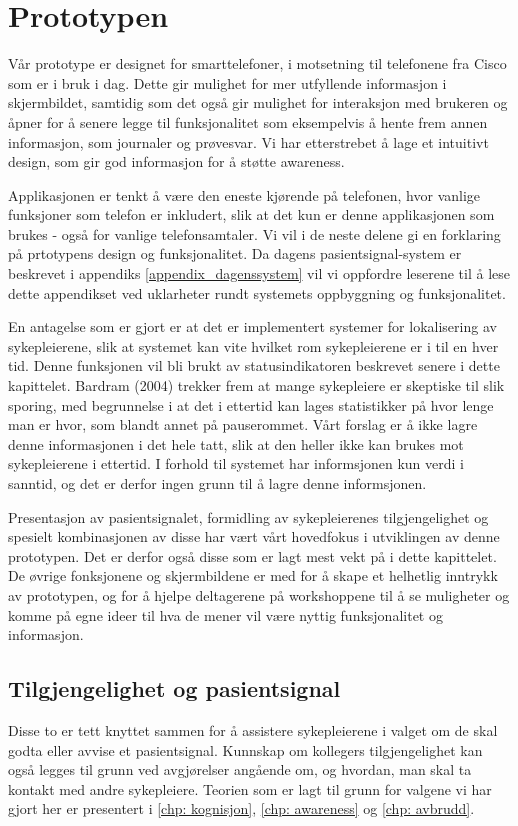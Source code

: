 \section{Prototypen}
\label{prototypen}

Vår prototype er designet for smarttelefoner, i motsetning til telefonene fra Cisco som er i bruk i dag. Dette gir mulighet for mer utfyllende informasjon i skjermbildet, samtidig som det også gir mulighet for interaksjon med brukeren og åpner for å senere legge til funksjonalitet som eksempelvis å hente frem annen informasjon, som journaler og prøvesvar. Vi har etterstrebet å lage et intuitivt design, som gir god informasjon for å støtte awareness.

\noindent
Applikasjonen er tenkt å være den eneste kjørende på telefonen, hvor vanlige funksjoner som telefon er inkludert, slik at det kun er denne applikasjonen som brukes - også for vanlige telefonsamtaler. Vi vil i de neste delene gi en forklaring på prtotypens design og funksjonalitet. Da dagens pasientsignal-system er beskrevet i appendiks \ref{appendix_dagenssystem} vil vi oppfordre leserene til å lese dette appendikset ved uklarheter rundt systemets oppbyggning og funksjonalitet.

\noindent
En antagelse som er gjort er at det er implementert systemer for lokalisering av sykepleierene, slik at systemet kan vite hvilket rom sykepleierene er i til en hver tid. Denne funksjonen vil bli brukt av statusindikatoren beskrevet senere i dette kapittelet. Bardram (2004) trekker frem at mange sykepleiere er skeptiske til slik sporing, med begrunnelse i at det i ettertid kan lages statistikker på hvor lenge man er hvor, som blandt annet på pauserommet. Vårt forslag er å ikke lagre denne informasjonen i det hele tatt, slik at den heller ikke kan brukes mot sykepleierene i ettertid. I forhold til systemet har informsjonen kun verdi i sanntid, og det er derfor ingen grunn til å lagre denne informsjonen.

\noindent
Presentasjon av pasientsignalet, formidling av sykepleierenes tilgjengelighet og spesielt kombinasjonen av disse har vært vårt hovedfokus i utviklingen av denne prototypen. Det er derfor også disse som er lagt mest vekt på i dette kapittelet. De øvrige fonksjonene og skjermbildene er med for å skape et helhetlig inntrykk av prototypen, og for å hjelpe deltagerene på workshoppene til å se muligheter og komme på egne ideer til hva de mener vil være nyttig funksjonalitet og informasjon.

\subsection{Tilgjengelighet og pasientsignal}
Disse to er tett knyttet sammen for å assistere sykepleierene i valget om de skal godta eller avvise et pasientsignal. Kunnskap om kollegers tilgjengelighet kan også legges til grunn ved avgjørelser angående om, og hvordan, man skal ta kontakt med andre sykepleiere. Teorien som er lagt til grunn for valgene vi har gjort her er presentert i \ref{chp: kognisjon}, \ref{chp: awareness} og \ref{chp: avbrudd}.

